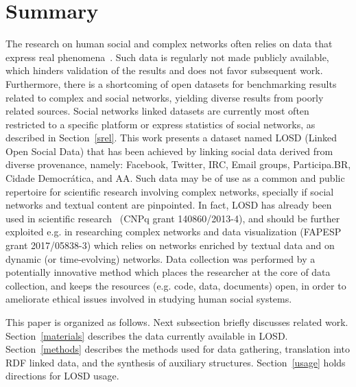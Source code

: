\documentclass[data,datadescriptor,submit,moreauthors,pdftex]{Definitions/mdpi}
\begin{document}
\section{Summary}
The research on human social and complex networks often
relies on data that express real phenomena~\cite{c1,c2,c3}.
Such data is regularly not made publicly available,
which hinders validation of the results
and does not favor subsequent work.
Furthermore, there is a shortcoming of open datasets for benchmarking results
related to complex and social networks,
yielding diverse results from poorly related sources.
Social networks linked datasets are currently most often restricted to a specific platform
or express statistics of social networks, as described in Section~\ref{srel}.
This work presents 
a dataset named LOSD (Linked Open Social Data)
that has been achieved by linking social data derived from diverse
provenance, namely: Facebook, Twitter, IRC, Email groups, Participa.BR, Cidade Democrática, and AA.
Such data may be of use as a common and public repertoire for scientific
research involving complex networks, specially if social networks and textual content are pinpointed.
In fact, LOSD has already been used in scientific research~\cite{stab,thesis} (CNPq grant 140860/2013-4),
and should be further exploited e.g. in researching complex networks and data visualization (FAPESP grant 2017/05838-3)
which relies on networks enriched by textual data and on dynamic (or time-evolving) networks.
Data collection was performed by a potentially innovative method which places the researcher
at the core of data collection, and keeps the resources (e.g. code, data, documents) open,
in order to ameliorate ethical issues involved in studying human social systems.

This paper is organized as follows. Next subsection briefly discusses related work.
Section~\ref{materials} describes the data currently available in LOSD.
Section~\ref{methods} describes the methods used for data gathering,
translation into RDF linked data, and the synthesis of auxiliary structures.
Section~\ref{usage} holds directions for LOSD usage. 
\end{document}
